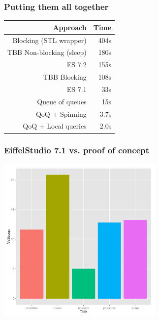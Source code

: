 \documentclass{beamer}
\begin{document}
\begin{frame}
  \frametitle{Putting them all together}

  \begin{center}
  \begin{tabular}{r|r}
    Approach &  Time  \\ \hline
    Blocking (STL wrapper)   &  404s \\
    TBB Non-blocking (sleep) &  180s \\
    ES 7.2                   &  155s \\
    TBB Blocking             &  108s \\
    ES 7.1                   &   33s \\
    Queue of queues          &   15s \\
    QoQ + Spinning           &  3.7s \\
    QoQ + Local queries      &  2.0s \\
  \end{tabular}
  \end{center}
\end{frame}

\begin{frame}
  \frametitle{EiffelStudio 7.1 vs. proof of concept}
  \begin{center}
    \includegraphics[width=3.2in]{share-bar}
  \end{center}
\end{frame}
\end{document}
